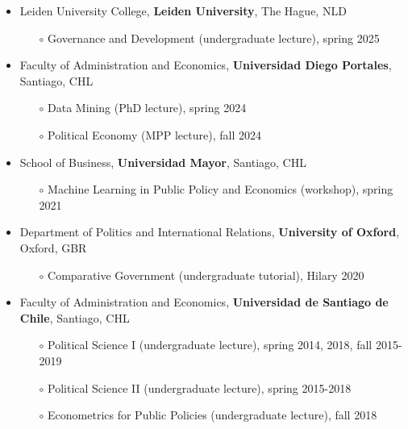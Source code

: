 \begin{publications}

\begin{itemize}
\item{\small Leiden University College, {\bfseries Leiden University}, The Hague, NLD}
\begin{itemize}
\item[$\circ$]{\small Governance and Development (undergraduate lecture), spring 2025}
\end{itemize}
\item{\small Faculty of Administration and Economics, {\bfseries Universidad Diego Portales}, Santiago, CHL}
\begin{itemize}
\item[$\circ$]{\small Data Mining (PhD lecture), spring 2024}
\item[$\circ$]{\small Political Economy (MPP lecture), fall 2024}
\end{itemize}
\item{\small School of Business, {\bfseries Universidad Mayor}, Santiago, CHL}
\begin{itemize}
\item[$\circ$]{\small Machine Learning in Public Policy and Economics (workshop), spring 2021}
\end{itemize}
\item{\small Department of Politics and International Relations, {\bfseries University of Oxford}, Oxford, GBR}
\begin{itemize}
\item[$\circ$]{\small Comparative Government (undergraduate tutorial), Hilary 2020}
\end{itemize}
\item{\small Faculty of Administration and Economics, {\bfseries Universidad de Santiago de Chile}, Santiago, CHL}
\begin{itemize}
\item[$\circ$]{\small Political Science I (undergraduate lecture), spring 2014, 2018, fall 2015-2019}
\item[$\circ$]{\small Political Science II (undergraduate lecture), spring 2015-2018}
\item[$\circ$]{\small Econometrics for Public Policies (undergraduate lecture), fall 2018}

\end{itemize}
\end{itemize}
\end{publications}
